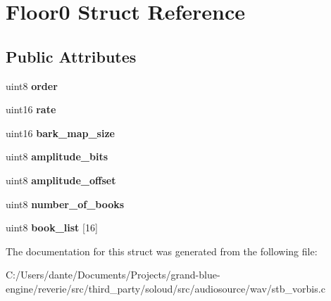 \hypertarget{struct_floor0}{}\section{Floor0 Struct Reference}
\label{struct_floor0}
\subsection*{Public Attributes}
\begin{DoxyCompactItemize}
\item 
\mbox{\label{struct_floor0_a4f6f2873ce6067d00a46711f1a77cc64}} 
uint8 {\bfseries order}
\item 
\mbox{\label{struct_floor0_a922586e1bbbe9c1729764ce4e9c58081}} 
uint16 {\bfseries rate}
\item 
\mbox{\label{struct_floor0_ad25748f935add45259c7739644c3dfde}} 
uint16 {\bfseries bark\+\_\+map\+\_\+size}
\item 
\mbox{\label{struct_floor0_a49a1999f7063382cf289e36f3f679281}} 
uint8 {\bfseries amplitude\+\_\+bits}
\item 
\mbox{\label{struct_floor0_a2c57037c224748b8bb5586f668a66903}} 
uint8 {\bfseries amplitude\+\_\+offset}
\item 
\mbox{\label{struct_floor0_ab72ef807e63af61f9e473752753b135a}} 
uint8 {\bfseries number\+\_\+of\+\_\+books}
\item 
\mbox{\label{struct_floor0_a9c9a2f623bc164826e892f7d75c484f2}} 
uint8 {\bfseries book\+\_\+list} \mbox{[}16\mbox{]}
\end{DoxyCompactItemize}


The documentation for this struct was generated from the following file\+:\begin{DoxyCompactItemize}
\item 
C\+:/\+Users/dante/\+Documents/\+Projects/grand-\/blue-\/engine/reverie/src/third\+\_\+party/soloud/src/audiosource/wav/stb\+\_\+vorbis.\+c\end{DoxyCompactItemize}
